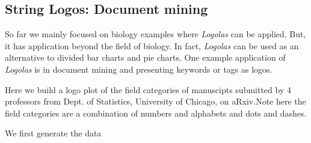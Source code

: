 \documentclass[12pt]{article}\usepackage[]{graphicx}\usepackage[usenames,dvipsnames]{color}
\newcommand{\Logolas}{\textit{Logolas}}
\begin{document}
\newpage

\subsection{String Logos:  Document mining}

So far we mainly focused on biology examples where \Logolas{} can be applied. But,
it has application beyond the field of biology. In fact, \Logolas{} can be used as
an alternative to divided bar charts and pie charts. One example application of \Logolas{} is in document mining and presenting keywords or tags as logos.

Here we build a logo plot of the field categories of manuscipts submitted by 4
professors from Dept. of Statistics, University of Chicago, on aRxiv.Note here the field categories are a combination of numbers and alphabets and dots and dashes.

We first generate the data
\end{document}
